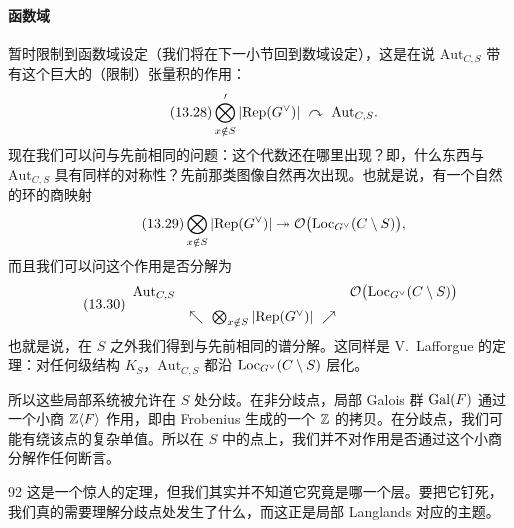 \paragraph{函数域}
暂时限制到函数域设定（我们将在下一小节回到数域设定），这是在说 $\mathrm{Aut}_{C,S}$ 带有这个巨大的（限制）张量积的作用：
\begin{equation}\tag{13.28}
\bigotimes'_{x\notin S}|\Rep(G^\vee)|\ \curvearrowright\ \mathrm{Aut}_{C,S}.
\end{equation}
现在我们可以问与先前相同的问题：这个代数还在哪里出现？即，什么东西与 $\mathrm{Aut}_{C,S}$ 具有同样的对称性？先前那类图像自然再次出现。也就是说，有一个自然的环的商映射
\begin{equation}\tag{13.29}
\bigotimes_{x\notin S}|\mathrm{Rep}(G^\vee)|\twoheadrightarrow\mathcal{O}\bigl(\mathrm{Loc}_{G^\vee}(C\setminus S)\bigr),
\end{equation}
而且我们可以问这个作用是否分解为
\begin{equation}\tag{13.30}
\begin{array}{ccc}
\mathrm{Aut}_{C,S} & & \mathcal{O}\bigl(\mathrm{Loc}_{G^\vee}(C\setminus S)\bigr)\\[6pt]
& \nwarrow\ \bigotimes_{x\notin S}|\mathrm{Rep}(G^\vee)|\ \nearrow &
\end{array}
\end{equation}
也就是说，在 $S$ 之外我们得到与先前相同的谱分解。这同样是 V.~Lafforgue 的定理：对任何级结构 $K_S$，$\mathrm{Aut}_{C,S}$ 都沿 $\mathrm{Loc}_{G^\vee}(C\setminus S)$ 层化。

所以这些局部系统被允许在 $S$ 处分歧。在非分歧点，局部 Galois 群 $\mathrm{Gal}(F)$ 通过一个小商 $\mathbb{Z}\langle F\rangle$ 作用，即由 Frobenius 生成的一个 $\mathbb{Z}$ 的拷贝。在分歧点，我们可能有绕该点的复杂单值。所以在 $S$ 中的点上，我们并不对作用是否通过这个小商分解作任何断言。

\begin{srcrem}{92}
这是一个惊人的定理，但我们其实并不知道它究竟是哪一个层。要把它钉死，我们真的需要理解分歧点处发生了什么，而这正是局部 Langlands 对应的主题。
\end{srcrem}

